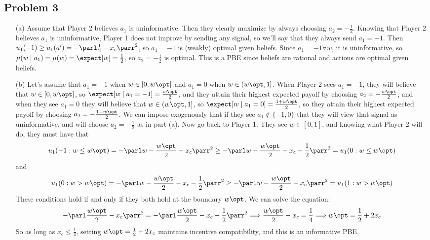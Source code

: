 \documentclass[10pt]{article}
\begin{document}
\subsection*{Problem 3}

\begin{itemize}
	\item[(a)] Assume that Player 2 believes $a_1$ is uninformative. Then they clearly maximize by always choosing $a_2 = -\frac{1}{2}$. Knowing that Player 2 believes $a_1$ is uninformative, Player 1 does not improve by sending any signal, so we'll say that they always send $a_1 = -1$. Then $u_1(-1) \ge u_1(a') = -\parl \frac{1}{2}-x_c\parr^2$, so $a_1=-1$ is (weakly) optimal given beliefs. Since $a_1 = -1 \forall w$, it is uninformative, so $\mu(w \mid a_1) = \mu(w) = \expect[w] = \frac{1}{2}$, so $a_2 = -\frac{1}{2}$ is optimal. This is a PBE since beliefs are rational and actions are optimal given beliefs.
	\item[(b)] Let's assume that $a_1 = -1$ when $w \in [0,w\opt]$ and $a_1=0$ when $w \in (w\opt,1]$. When Player 2 sees $a_1 = -1$, they will believe that $w \in [0,w\opt]$, so $\expect[w \mid a_1=-1] = \frac{w\opt}{2}$, and they attain their highest expected payoff by choosing $a_2 = -\frac{w\opt}{2}$, and when they see $a_1 = 0$ they will believe that $w \in (w\opt,1]$, so $\expect[w \mid a_1 = 0] = \frac{1+w\opt}{2}$, so they attain their highest expected payoff by choosing $a_2 = -\frac{1+w\opt}{2}$. We can impose exogenously that if they see $a_1 \not\in\{-1,0\}$ that they will view that signal as uninformative, and will choose $a_2 = -\frac{1}{2}$ as in part (a). Now go back to Player 1. They see $w \in [0,1]$, and knowing what Player 2 will do, they must have that \[u_1(-1: w \le w\opt) = -\parl w - \frac{w\opt}{2}-x_c\parr^2 \ge -\parl w - \frac{w\opt}{2}-x_c-\frac{1}{2}\parr^2 = u_1(0: w \le w\opt)\]and \[u_1(0: w > w\opt) = -\parl w - \frac{w\opt}{2}-x_c - \frac{1}{2}\parr^2 \ge -\parl w - \frac{w\opt}{2}-x_c\parr^2 = u_1(1:w>w\opt)\]These conditions hold if and only if they both hold at the boundary $w\opt$. We can solve the equation:\[-\parl \frac{w\opt}{2} - x_c\parr^2 = -\parl \frac{w\opt}{2} - x_c - \frac{1}{2}\parr^2  \Longrightarrow \frac{w\opt}{2} - x_c = \frac{1}{4} \Longrightarrow w\opt = \frac{1}{2} + 2x_c\]So as long as $x_c \le \frac{1}{4}$, setting $w\opt = \frac{1}{2}+2x_c$ maintains incentive compatibility, and this is an informative PBE.
\end{itemize}
\end{document}
